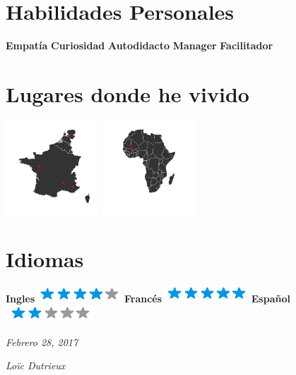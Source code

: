 \documentclass[spanish]{friggeri-cv}
\begin{document}
\begin{aside}
~
~
~
\section{Habilidades Personales}
    \textbf{Empatía}
    \textbf{Curiosidad}
    \textbf{Autodidacto}
    \textbf{Manager}
    \textbf{Facilitador} 
    ~
  \section{Lugares donde he vivido}
    \includegraphics[width=3.5cm]{img/map.png}
    \includegraphics[width=3.5cm]{img/mapAfrica.png}
    ~
  \section{Idiomas}
    \textbf{Ingles}\includegraphics[scale=0.40]{img/4stars.png}
    \textbf{Francés}\includegraphics[scale=0.40]{img/5stars.png}
    \textbf{Español}\includegraphics[scale=0.40]{img/2stars.png}
\end{aside}

\begin{flushleft}
\emph{Febrero 28, 2017}
\end{flushleft}
\begin{flushright}
\emph{Lo\"{i}c Dutrieux}
\end{flushright}
\end{document}
